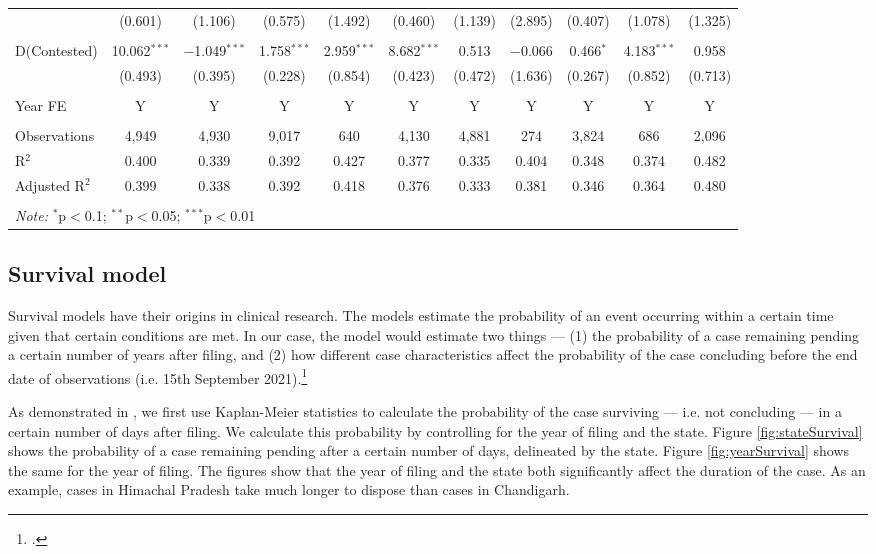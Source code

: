 \begin{landscape}
\begin{table}
{\begin{tabular}{lcccccccccc}
 & (0.601) & (1.106) & (0.575) & (1.492) & (0.460) & (1.139) & (2.895) & (0.407) & (1.078) & (1.325) \\ 
 & & & & & & & & & & \\ 
 D(Contested) & 10.062$^{***}$ & $-$1.049$^{***}$ & 1.758$^{***}$ & 2.959$^{***}$ & 8.682$^{***}$ & 0.513 & $-$0.066 & 0.466$^{*}$ & 4.183$^{***}$ & 0.958 \\ 
 & (0.493) & (0.395) & (0.228) & (0.854) & (0.423) & (0.472) & (1.636) & (0.267) & (0.852) & (0.713) \\ 
 \hline \\[-1.8ex]
 Year FE & Y & Y & Y & Y & Y & Y & Y & Y & Y & Y \\
 \hline \\[-1.8ex] 
 Observations & 4,949 & 4,930 & 9,017 & 640 & 4,130 & 4,881 & 274 & 3,824 & 686 & 2,096 \\ 
 R$^{2}$ & 0.400 & 0.339 & 0.392 & 0.427 & 0.377 & 0.335 & 0.404 & 0.348 & 0.374 & 0.482 \\ 
 Adjusted R$^{2}$ & 0.399 & 0.338 & 0.392 & 0.418 & 0.376 & 0.333 & 0.381 & 0.346 & 0.364 & 0.480 \\ 
 \hline \\[-1.8ex] 
 \multicolumn{11}{l}{\textit{Note:} $^{*}$p$<$0.1; $^{**}$p$<$0.05; $^{***}$p$<$0.01} \\ 
 \end{tabular} }
 \end{table}
\end{landscape}

\subsection{Survival model}
\label{sec:survivalModel}

Survival models have their origins in clinical research. The models estimate the probability of an event occurring within a certain time given that certain conditions are met. In our case, the model would estimate two things --- (1) the probability of a case remaining pending a certain number of years after filing, and (2) how different case characteristics affect the probability of the case concluding before the end date of observations (i.e. 15th September 2021).\footcite[For a prior example of the use of hazard models for empirical judicial analysis, see][]{datta2017_itatDelays}

As demonstrated in \textcite{datta2017_itatDelays}, we first use Kaplan-Meier statistics to calculate the probability of the case surviving --- i.e. not concluding --- in a certain number of days after filing. We calculate this probability by controlling for the year of filing and the state. Figure \ref{fig:stateSurvival} shows the probability of a case remaining pending after a certain number of days, delineated by the state. Figure \ref{fig:yearSurvival} shows the same for the year of filing. The figures show that the year of filing and the state both significantly affect the duration of the case. As an example, cases in Himachal Pradesh take much longer to dispose than cases in Chandigarh.


